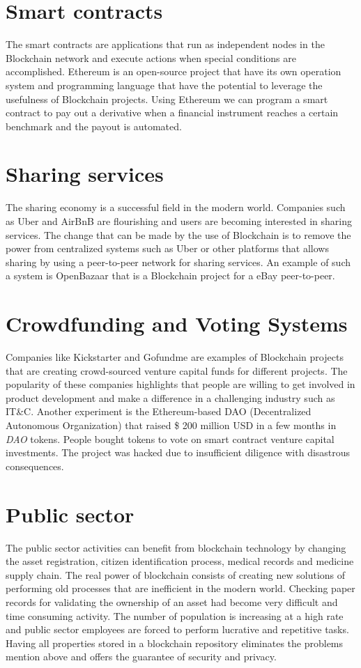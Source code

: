 \section{Smart contracts}
\label{sec:smartcontracts}
The smart contracts are applications that run as independent nodes in the Blockchain network and execute actions when special conditions are accomplished. Ethereum is an open-source project that have its own operation system and programming language that have the potential to leverage the usefulness of Blockchain projects. Using Ethereum we can program a smart contract to pay out a derivative when a financial instrument reaches a certain benchmark and the payout is automated.

\section{Sharing services}
\label{sec:sharingeconomy}
The sharing economy is a successful field in the modern world. Companies such as Uber and AirBnB are flourishing and users are becoming interested in sharing services. The change that can be made by the use of Blockchain is to remove the power from centralized systems such as Uber or other platforms that allows sharing by using a peer-to-peer network for sharing services. An example of such a system is OpenBazaar that is a Blockchain project for a eBay peer-to-peer.


\section{Crowdfunding and Voting Systems}
\label{sec:crowdfunding}
Companies like Kickstarter and Gofundme are examples of Blockchain projects that are creating crowd-sourced venture capital funds for different projects. The popularity  of these companies highlights that people are willing to get involved in product development and make a difference in a challenging industry such as IT\&C.
Another experiment is the Ethereum-based DAO (Decentralized Autonomous Organization) that raised \$ 200 million USD in a few months in \emph{DAO} tokens. People bought tokens to vote on smart contract venture capital investments. The project was hacked due to insufficient diligence with disastrous consequences.

\section{Public sector}
\label{sub-sec:chapter2-subsection2}
The public sector activities can benefit from blockchain technology by changing the asset registration, citizen identification process, medical records and
medicine supply chain. The real power of blockchain consists of creating new
solutions of performing old processes that are inefficient in the modern world.
Checking paper records for validating the ownership of an asset had become very
difficult and time consuming activity. The number of population is increasing
at a high rate and public sector employees are forced to perform lucrative and
repetitive tasks. Having all properties stored in a blockchain repository eliminates the problems mention above and offers the guarantee of security and
privacy.

